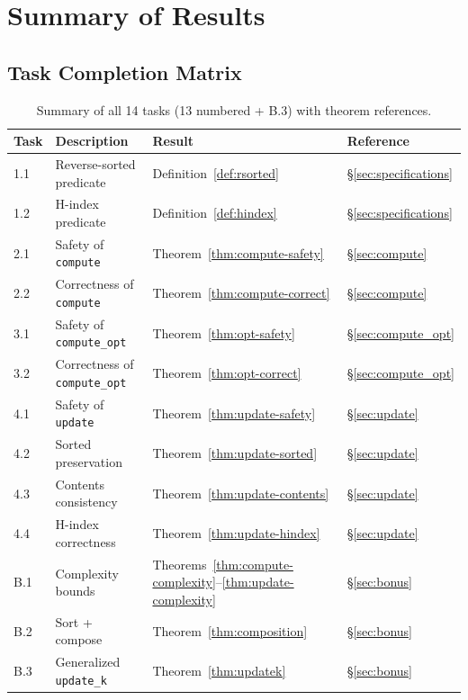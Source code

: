 \appendix
\section{Summary of Results}
\label{sec:appendix}

\subsection{Task Completion Matrix}

\begin{table}[h]
\centering
\begin{tabular}{@{}llll@{}}
\toprule
\textbf{Task} & \textbf{Description} & \textbf{Result} & \textbf{Reference} \\
\midrule
1.1 & Reverse-sorted predicate & Definition~\ref{def:rsorted} & \S\ref{sec:specifications} \\
1.2 & H-index predicate & Definition~\ref{def:hindex} & \S\ref{sec:specifications} \\
\midrule
2.1 & Safety of \texttt{compute} & Theorem~\ref{thm:compute-safety} & \S\ref{sec:compute} \\
2.2 & Correctness of \texttt{compute} & Theorem~\ref{thm:compute-correct} & \S\ref{sec:compute} \\
\midrule
3.1 & Safety of \texttt{compute\_opt} & Theorem~\ref{thm:opt-safety} & \S\ref{sec:compute_opt} \\
3.2 & Correctness of \texttt{compute\_opt} & Theorem~\ref{thm:opt-correct} & \S\ref{sec:compute_opt} \\
\midrule
4.1 & Safety of \texttt{update} & Theorem~\ref{thm:update-safety} & \S\ref{sec:update} \\
4.2 & Sorted preservation & Theorem~\ref{thm:update-sorted} & \S\ref{sec:update} \\
4.3 & Contents consistency & Theorem~\ref{thm:update-contents} & \S\ref{sec:update} \\
4.4 & H-index correctness & Theorem~\ref{thm:update-hindex} & \S\ref{sec:update} \\
\midrule
B.1 & Complexity bounds & Theorems~\ref{thm:compute-complexity}--\ref{thm:update-complexity} & \S\ref{sec:bonus} \\
B.2 & Sort + compose & Theorem~\ref{thm:composition} & \S\ref{sec:bonus} \\
B.3 & Generalized \texttt{update\_k} & Theorem~\ref{thm:updatek} & \S\ref{sec:bonus} \\
\bottomrule
\end{tabular}
\caption{Summary of all 14 tasks (13 numbered + B.3) with theorem references.}
\label{tab:summary}
\end{table}


